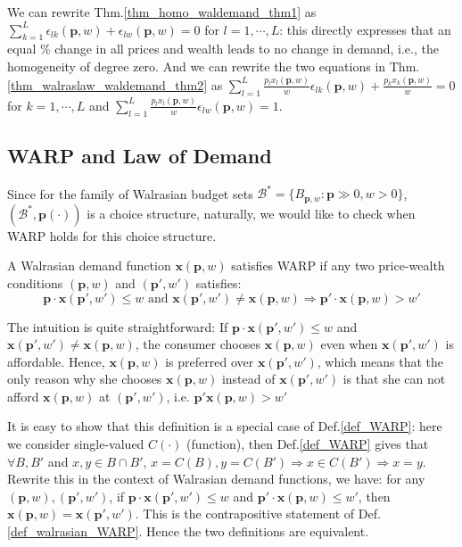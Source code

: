 We can rewrite Thm.\ref{thm_homo_waldemand_thm1} as $\sum^L_{k=1}\epsilon_{lk}(\mathbf{p},w)+\epsilon_{lw}(\mathbf{p},w)=0$ for $l=1,\cdots,L$: this directly expresses that an equal \% change in all prices and wealth leads to no change in demand, i.e., the homogeneity of degree zero.
And we can rewrite the two equations in Thm.\ref{thm_walraslaw_waldemand_thm2} as $\sum^L_{l=1}\frac{p_lx_l(\mathbf{p},w)}{w}\epsilon_{lk}(\mathbf{p},w)+\frac{p_kx_k(\mathbf{p},w)}{w}=0$ for $k=1,\cdots,L$ and $\sum^L_{l=1}\frac{p_lx_l(\mathbf{p},w)}{w}\epsilon_{lw}(\mathbf{p},w)=1$.

\subsection{WARP and Law of Demand}
Since for the family of Walrasian budget sets $\mathcal{B}^*=\{B_{\mathbf{p},w}:\mathbf{p}\gg 0,w>0\}$, $(\mathcal{B}^*,\mathbf{p}(\cdot))$ is a choice structure, naturally, we would like to check when WARP holds for this choice structure.

\begin{definition}\label{def_walrasian_WARP}
    A Walrasian demand function $\mathbf{x}(\mathbf{p},w)$ satisfies WARP if any two price-wealth conditions $(\mathbf{p},w)$ and $(\mathbf{p}',w')$ satisfies:
    $$\mathbf{p}\cdot \mathbf{x}(\mathbf{p}',w')\leq w\text{ and }\mathbf{x}(\mathbf{p}',w')\neq \mathbf{x}(\mathbf{p},w)\Rightarrow \mathbf{p}'\cdot\mathbf{x}(\mathbf{p},w)>w'$$
\end{definition}

The intuition is quite straightforward: If $\mathbf{p}\cdot \mathbf{x}(\mathbf{p}',w')\leq w$ and $\mathbf{x}(\mathbf{p}',w')\neq \mathbf{x}(\mathbf{p},w)$, the consumer chooses $\mathbf{x}(\mathbf{p},w)$ even when $\mathbf{x}(\mathbf{p}',w')$ is affordable. Hence, $\mathbf{x}(\mathbf{p},w)$ is preferred over $\mathbf{x}(\mathbf{p}',w')$, which means that the only reason why she chooses $\mathbf{x}(\mathbf{p},w)$ instead of $\mathbf{x}(\mathbf{p}',w')$ is that she can not afford $\mathbf{x}(\mathbf{p},w)$ at $(\mathbf{p}',w')$, i.e. $\mathbf{p}'\mathbf{x}(\mathbf{p},w)>w'$

It is easy to show that this definition is a special case of Def.\ref{def_WARP}: here we consider single-valued $C(\cdot)$ (function), then Def.\ref{def_WARP} gives that $\forall B,B'$ and $x,y\in B\cap B'$, $x=C(B),y=C(B')\Rightarrow x\in C(B')\Rightarrow x=y$. Rewrite this in the context of Walrasian demand functions, we have: for any $(\mathbf{p},w),(\mathbf{p}',w')$, if $\mathbf{p}\cdot\mathbf{x}(\mathbf{p}',w')\leq w$ and $\mathbf{p}'\cdot \mathbf{x}(\mathbf{p},w)\leq w'$, then $\mathbf{x}(\mathbf{p},w)=\mathbf{x}(\mathbf{p'},w')$. This is the contrapositive statement of Def.\ref{def_walrasian_WARP}. Hence the two definitions are equivalent.